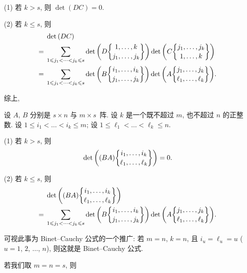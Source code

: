\documentclass[../libro.tex]{subfiles}
\begin{document}
(1)
若 \(k > s\), 则 \(\det {(DC)} = 0\).

(2)
若 \(k \leq s\), 则
\begin{align*}
    & \det {(DC)}
    \\
    = {} & \sum_{1 \leq j_1 < \dots < j_k \leq s}
    {
        \det {\left(
                D\submat{1, \dots, k}{j_1, \dots, j_k}
        \right)}
        \det {\left(
                C\submat{j_1, \dots, j_k}{1, \dots, k}
        \right)}
    }
    \\
    = {} & \sum_{1 \leq j_1 < \dots < j_k \leq s}
    {
        \det {\left(
                B\submat{i_1, \dots, i_k}{j_1, \dots, j_k}
        \right)}
        \det {\left(
                A\submat{j_1, \dots, j_k}{\ell_1, \dots, \ell_k}
        \right)}
    }.
\end{align*}

综上,

\begin{theorem}
    设 \(A\), \(B\) 分别是 \(s \times n\) 与 \(m \times s\)~阵.
    设 \(k\) 是一个既不超过 \(m\), 也不超过 \(n\) 的正整数.
    设 \(1 \leq i_1 < \dots < i_k \leq m\);
    设 \(1 \leq \ell_1 < \dots < \ell_k \leq n\).

    (1)
    若 \(k > s\), 则
    \begin{align*}
        \det {\left(
                (BA)\submat{i_1,\dots,i_k}{\ell_1,\dots,\ell_k}
        \right)} = 0.
    \end{align*}

    (2)
    若 \(k \leq s\), 则
    \begin{align*}
        & \det {\left(
                (BA)\submat{i_1,\dots,i_k}{\ell_1,\dots,\ell_k}
        \right)}
        \\
        = {} & \sum_{1 \leq j_1 < \dots < j_k \leq s}
        {
            \det {\left(
                    B\submat{i_1, \dots, i_k}{j_1, \dots, j_k}
            \right)}
            \det {\left(
                    A\submat{j_1, \dots, j_k}{\ell_1, \dots, \ell_k}
            \right)}
        }.
    \end{align*}
\end{theorem}

可视此事为 Binet--Cauchy 公式的一个推广:
若 \(m = n\), \(k = n\),
且
\(i_u = \ell_u = u\) (\(u = 1\), \(2\), \(\dots\), \(n\)),
则这就是 Binet--Cauchy 公式.

\vspace{2ex}

若我们取 \(m = n = s\), 则
\end{document}
